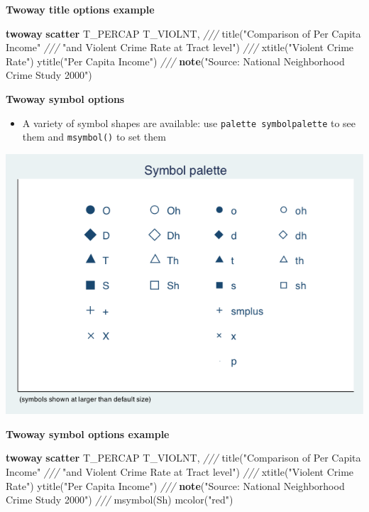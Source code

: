 \documentclass[
]{book}
\newenvironment{Shaded}{\begin{snugshade}}{\end{snugshade}}
\newcommand{\BaseNTok}[1]{\textcolor[rgb]{0.00,0.00,0.81}{#1}}
\newcommand{\CommentTok}[1]{\textcolor[rgb]{0.56,0.35,0.01}{\textit{#1}}}
\newcommand{\KeywordTok}[1]{\textcolor[rgb]{0.13,0.29,0.53}{\textbf{#1}}}
\newcommand{\NormalTok}[1]{#1}
\newcommand{\StringTok}[1]{\textcolor[rgb]{0.31,0.60,0.02}{#1}}
\providecommand{\tightlist}{%
  \setlength{\itemsep}{0pt}\setlength{\parskip}{0pt}}
\begin{document}
\textbf{Twoway title options example}

\begin{Shaded}
\begin{Highlighting}[]
\KeywordTok{twoway} \KeywordTok{scatter}\NormalTok{ T\_PERCAP T\_VIOLNT, }\CommentTok{///}
    \BaseNTok{title}\NormalTok{(}\StringTok{"Comparison of Per Capita Income"} \CommentTok{///}
          \StringTok{"and Violent Crime Rate at Tract level"}\NormalTok{) }\CommentTok{///}
    \BaseNTok{xtitle}\NormalTok{(}\StringTok{"Violent Crime Rate"}\NormalTok{) }\BaseNTok{ytitle}\NormalTok{(}\StringTok{"Per Capita Income"}\NormalTok{) }\CommentTok{///}
    \KeywordTok{note}\NormalTok{(}\StringTok{"Source: National Neighborhood Crime Study 2000"}\NormalTok{)}
\end{Highlighting}
\end{Shaded}

\textbf{Twoway symbol options}

\begin{itemize}
\tightlist
\item
  A variety of symbol shapes are available: use \texttt{palette\ symbolpalette} to see them and \texttt{msymbol()} to set them
\end{itemize}

\includegraphics{Stata/StataGraphics/images/Symbol.png}

\textbf{Twoway symbol options example}

\begin{Shaded}
\begin{Highlighting}[]
\KeywordTok{twoway} \KeywordTok{scatter}\NormalTok{ T\_PERCAP T\_VIOLNT, }\CommentTok{///}
    \BaseNTok{title}\NormalTok{(}\StringTok{"Comparison of Per Capita Income"} \CommentTok{///}
          \StringTok{"and Violent Crime Rate at Tract level"}\NormalTok{) }\CommentTok{///}
    \BaseNTok{xtitle}\NormalTok{(}\StringTok{"Violent Crime Rate"}\NormalTok{) }\BaseNTok{ytitle}\NormalTok{(}\StringTok{"Per Capita Income"}\NormalTok{) }\CommentTok{///}
    \KeywordTok{note}\NormalTok{(}\StringTok{"Source: National Neighborhood Crime Study 2000"}\NormalTok{) }\CommentTok{///}
    \BaseNTok{msymbol}\NormalTok{(Sh) mcolor(}\StringTok{"red"}\NormalTok{)}
\end{Highlighting}
\end{Shaded}
\end{document}
